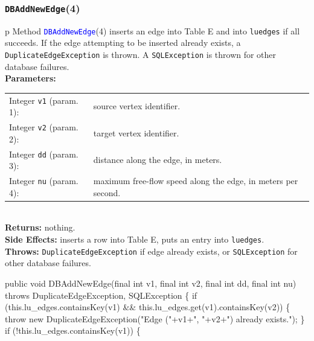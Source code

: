 \documentclass{article}
\theoremstyle{definition}                   %
\begin{document}
\subsubsection{{\tt{}\protect{}DBAddNewEdge}(4)}
\begin{tabular}{p{\textwidth}}
\toprule
{}
Method \textcolor{blue}{{\tt{}\protect{}DBAddNewEdge}}(4) inserts an edge into Table E
and into {\tt{}\protect{}lu{}edges} if all succeeds. If the edge attempting to be inserted
already exists, a {\tt{}DuplicateEdgeException} is thrown. A {\tt{}SQLException}
is thrown for other database failures.\\
\midrule
\textbf{Parameters:} \\
\begin{tabular}{lp{116mm}}
Integer {\tt{}v1} (param. 1):&source vertex identifier.\\
Integer {\tt{}v2} (param. 2):&target vertex identifier.\\
Integer {\tt{}dd} (param. 3):&distance along the edge, in meters.\\
Integer {\tt{}nu} (param. 4):&maximum free-flow speed along the edge, in meters per second.\\
\end{tabular}\\
\textbf{Returns:} nothing.\\
\textbf{Side Effects:} inserts a row into Table E, puts an entry into
{\tt{}\protect{}lu{}edges}.\\
\textbf{Throws:} {\tt{}DuplicateEdgeException} if edge already exists, or
{\tt{}SQLException} for other database failures.\\
\bottomrule
\end{tabular}
\nwenddocs{}\endmoddef{}
public void DBAddNewEdge(final int v1, final int v2, final int dd, final int nu)
throws DuplicateEdgeException, SQLException \{
  if (this.lu_edges.containsKey(v1) && this.lu_edges.get(v1).containsKey(v2)) \{
    throw new DuplicateEdgeException("Edge ("+v1+", "+v2+") already exists.");
  \}
  if (!this.lu_edges.containsKey(v1)) \{
\end{document}
